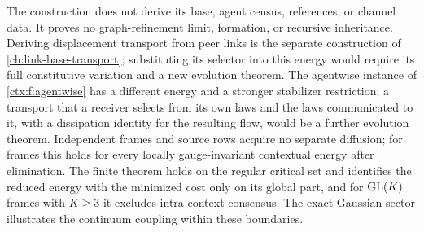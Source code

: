 The construction does not derive its base, agent census, references, or channel data. It proves no graph-refinement limit, formation, or recursive inheritance. Deriving displacement transport from peer links is the separate construction of \cref{ch:link-base-transport}; substituting its selector into this energy would require its full constitutive variation and a new evolution theorem. The agentwise instance of \cref{ctx:f:agentwise} has a different energy and a stronger stabilizer restriction; a transport that a receiver selects from its own laws and the laws communicated to it, with a dissipation identity for the resulting flow, would be a further evolution theorem. Independent frames and source rows acquire no separate diffusion; for frames this holds for every locally gauge-invariant contextual energy after elimination. The finite theorem holds on the regular critical set and identifies the reduced energy with the minimized cost only on its global part, and for $\mathrm{GL}(K)$ frames with $K\geq3$ it excludes intra-context consensus. The exact Gaussian sector illustrates the continuum coupling within these boundaries.


\endgroup
